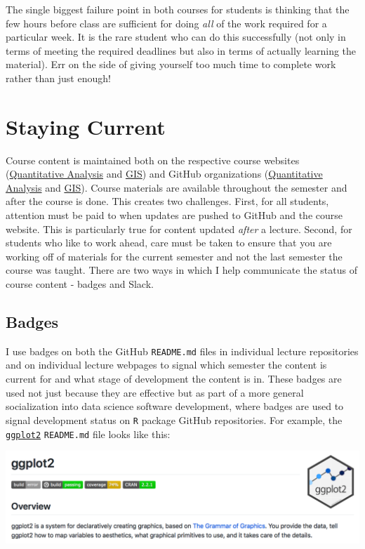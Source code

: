 \documentclass[]{book}
\theoremstyle{definition}
\theoremstyle{definition}
\theoremstyle{definition}
\theoremstyle{remark}
\begin{document}
The single biggest failure point in both courses for students is
thinking that the few hours before class are sufficient for doing
\emph{all} of the work required for a particular week. It is the rare
student who can do this successfully (not only in terms of meeting the
required deadlines but also in terms of actually learning the material).
Err on the side of giving yourself too much time to complete work rather
than just enough!

\section{Staying Current}\label{staying-current}

Course content is maintained both on the respective course websites
(\href{https://slu-soc5050.github.io}{Quantitative Analysis} and
\href{https://slu-soc5650.github.io}{GIS}) and GitHub organizations
(\href{https://github.com/slu-soc5050}{Quantitative Analysis} and
\href{https://github.com/slu-soc5650}{GIS}). Course materials are
available throughout the semester and after the course is done. This
creates two challenges. First, for all students, attention must be paid
to when updates are pushed to GitHub and the course website. This is
particularly true for content updated \emph{after} a lecture. Second,
for students who like to work ahead, care must be taken to ensure that
you are working off of materials for the current semester and not the
last semester the course was taught. There are two ways in which I help
communicate the status of course content - badges and Slack.

\subsection{Badges}\label{badges}

I use badges on both the GitHub \texttt{README.md} files in individual
lecture repositories and on individual lecture webpages to signal which
semester the content is current for and what stage of development the
content is in. These badges are used not just because they are effective
but as part of a more general socialization into data science software
development, where badges are used to signal development status on
\texttt{R} package GitHub repositories. For example, the
\href{https://github.com/tidyverse/ggplot2}{\texttt{ggplot2}}
\texttt{README.md} file looks like this:

\begin{center}\includegraphics[width=0.95\linewidth]{images/ggplot2Readme} \end{center}
\end{document}

